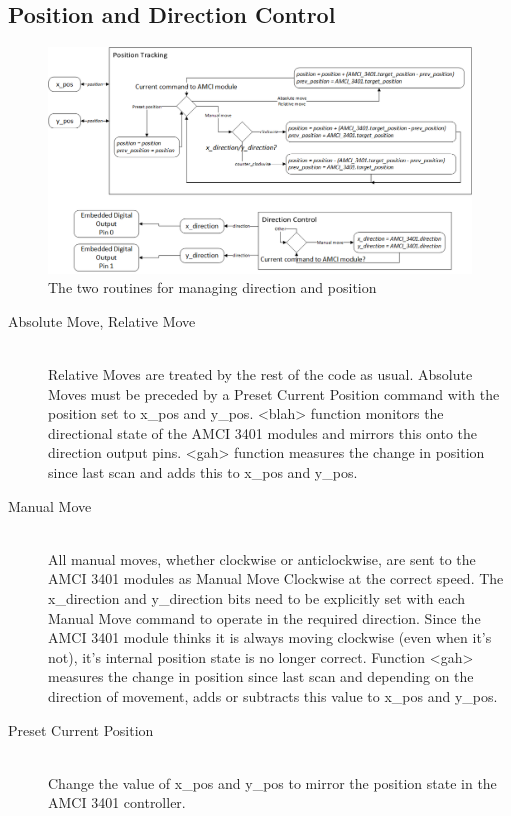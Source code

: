 \subsection{Position and Direction Control}
\label{sec:PLC-flowcharts-pos}

	\begin{figure}[htbp!]
		\includegraphics[width=\textwidth]{figures/cncMachine/position_direction}
		\caption{The two routines for managing direction and position}
		\label{fig:Direction and Positional Tracking}
	\end{figure}
	
				\begin{description}
					\item[Absolute Move, Relative Move] \hfill \\
						Relative Moves are treated by the rest of the code as usual. Absolute Moves must be preceded by a Preset Current Position command with the position set to x\_pos and y\_pos. <blah> function monitors the directional state of the AMCI 3401 modules and mirrors this onto the direction output pins. <gah> function measures the change in position since last scan and adds this to x\_pos and y\_pos.
					\item[Manual Move] \hfill \\
						All manual moves, whether clockwise or anticlockwise, are sent to the AMCI 3401 modules as Manual Move Clockwise at the correct speed. The x\_direction and y\_direction bits need to be explicitly set with each Manual Move command to operate in the required direction. Since the AMCI 3401 module thinks it is always moving clockwise (even when it's not), it's internal position state is no longer correct. Function <gah> measures the change in position since last scan and depending on the direction of movement, adds or subtracts this value to x\_pos and y\_pos.
					\item[Preset Current Position] \hfill \\
						Change the value of x\_pos and y\_pos to mirror the position state in the AMCI 3401 controller.
				\end{description}